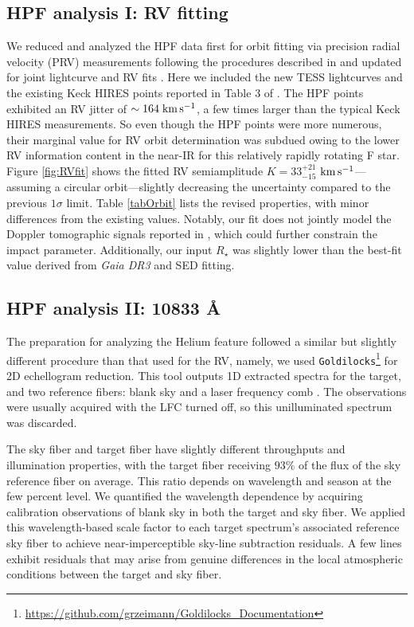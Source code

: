\documentclass[twocolumn]{aastex631}
\newcommand{\rstar}{\ensuremath{R_\star}}
\newcommand{\kms}{\ensuremath{\rm km\,s^{-1}}}
\begin{document}
\subsection{HPF analysis I: RV fitting}

We reduced and analyzed the HPF data first for orbit fitting via precision radial velocity (PRV) measurements following the procedures described in \citet{2021AJ....161..173T} and updated for joint lightcurve and RV fits \citep{2022AJ....163..225T}.  Here we included the new TESS lightcurves and the existing Keck HIRES points reported in Table 3 of \citet{2017AJ....153..211Z}.  The HPF points exhibited an RV jitter of $\sim164\;\kms$, a few times larger than the typical Keck HIRES measurements.  So even though the HPF points were more numerous, their marginal value for RV orbit determination was subdued owing to the lower RV information content in the near-IR for this relatively rapidly rotating F star.  Figure \ref{fig:RVfit} shows the fitted RV semiamplitude $K=33_{-15}^{+21}$ \kms---assuming a circular orbit---slightly decreasing the uncertainty compared to the previous $1\sigma$ limit.  Table \ref{tabOrbit} lists the revised properties, with minor differences from the existing values.  Notably, our fit does not jointly model the Doppler tomographic signals reported in \citep{2017AJ....153..211Z}, which could further constrain the impact parameter.  Additionally, our input $\rstar$ was slightly lower than the best-fit value derived from \emph{Gaia DR3} and SED fitting.

\subsection{HPF analysis II:  10833 \AA}
The preparation for analyzing the Helium feature followed a similar but slightly different procedure than that used for the RV, namely, we used \texttt{Goldilocks}\footnote{\url{https://github.com/grzeimann/Goldilocks_Documentation}} for 2D echellogram reduction.  This tool outputs 1D extracted spectra for the target, and two reference fibers: blank sky and a laser frequency comb \citep[LFC,][]{2019Optic...6..233M}.  The observations were usually acquired with the LFC turned off, so this unilluminated spectrum was discarded.

The sky fiber and target fiber have slightly different throughputs and illumination properties, with the target fiber receiving $93\%$ of the flux of the sky reference fiber on average.  This ratio depends on wavelength and season at the few percent level.  We quantified the wavelength dependence by acquiring calibration observations of blank sky in both the target and sky fiber.  We applied this wavelength-based scale factor to each target spectrum's associated reference sky fiber to achieve near-imperceptible sky-line subtraction residuals.  A few lines exhibit residuals that may arise from genuine differences in the local atmospheric conditions between the target and sky fiber.
\end{document}
